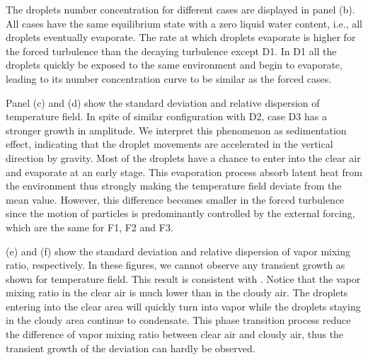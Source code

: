 The droplets number concentration for different cases are displayed in panel
(b). All cases have the same equilibrium state with a zero liquid water
content, i.e., all droplets eventually evaporate. The rate at which droplets
evaporate is higher for the forced turbulence than the decaying turbulence
except D1. In D1 all the droplets quickly be exposed to the same environment
and begin to evaporate, leading to its number concentration curve to be similar
as the forced cases.

Panel (c) and (d) show the standard deviation and relative dispersion of
temperature field. In spite of similar configuration with D2, case D3 has a
stronger growth in amplitude. We interpret this phenomenon as sedimentation
effect, indicating that the droplet movements are accelerated in the vertical
direction by gravity. Most of the droplets have a chance to enter into the
clear air and evaporate at an early stage. This evaporation process absorb
latent heat from the environment thus strongly making the temperature field
deviate from the mean value. However, this difference becomes smaller in the
forced turbulence since the motion of particles is predominantly controlled by
the external forcing, which are the same for F1, F2 and F3.

 (e) and (f) show the standard deviation and relative
dispersion of vapor mixing ratio, respectively. In these figures, we cannot
observe any transient growth as shown for temperature field. This result is
consistent with \cite{Kumar2014Lagrangian}. Notice that the vapor mixing ratio in the clear
air is much lower than in the cloudy air. The droplets entering into the clear
area will quickly turn into vapor while the droplets staying in the cloudy area
continue to condensate. This phase transition process reduce the difference of
vapor mixing ratio between clear air and cloudy air, thus the transient growth
of the deviation can hardly be observed.

\begin{figure}[!htbp]\centering 
{}
\end{figure}

